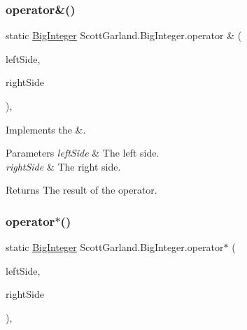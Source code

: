 \subsubsection{\texorpdfstring{operator\&()}{operator\&()}}
{\footnotesize\ttfamily static \hyperlink{class_scott_garland_1_1_big_integer}{Big\+Integer} Scott\+Garland.\+Big\+Integer.\+operator \& (\begin{DoxyParamCaption}\item[{\hyperlink{class_scott_garland_1_1_big_integer}{Big\+Integer}}]{left\+Side,  }\item[{\hyperlink{class_scott_garland_1_1_big_integer}{Big\+Integer}}]{right\+Side }\end{DoxyParamCaption})\hspace{0.3cm}{\ttfamily [inline]}, {\ttfamily [static]}}



Implements the \&. 


\begin{DoxyParams}{Parameters}
{\em left\+Side} & The left side.\\
\hline
{\em right\+Side} & The right side.\\
\hline
\end{DoxyParams}
\begin{DoxyReturn}{Returns}
The result of the operator.
\end{DoxyReturn}
\mbox{\label{class_scott_garland_1_1_big_integer_ae893cd71c07858e3ced194d364a5c1ba}} 
\subsubsection{\texorpdfstring{operator$\ast$()}{operator*()}}
{\footnotesize\ttfamily static \hyperlink{class_scott_garland_1_1_big_integer}{Big\+Integer} Scott\+Garland.\+Big\+Integer.\+operator$\ast$ (\begin{DoxyParamCaption}\item[{\hyperlink{class_scott_garland_1_1_big_integer}{Big\+Integer}}]{left\+Side,  }\item[{\hyperlink{class_scott_garland_1_1_big_integer}{Big\+Integer}}]{right\+Side }\end{DoxyParamCaption})\hspace{0.3cm}{\ttfamily [inline]}, {\ttfamily [static]}}



